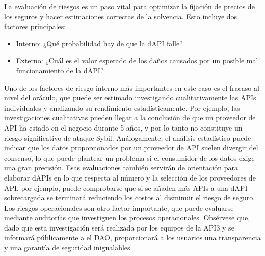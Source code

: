 \documentclass[11pt]{article}
\begin{document}
La evaluación de riesgos es un paso vital para optimizar la fijación de precios de los seguros y hacer estimaciones correctas de la solvencia. Esto incluye dos factores principales:

\begin{itemize}
    \item Interno: ¿Qué probabilidad hay de que la dAPI falle?
    \item Externo: ¿Cuál es el valor esperado de los daños causados por un posible mal funcionamiento de la dAPI?
\end{itemize}

Uno de los factores de riesgo interno más importantes en este caso es el fracaso al nivel del oráculo, que puede ser estimado investigando cualitativamente las APIs individuales y analizando su rendimiento estadísticamente. Por ejemplo, las investigaciones cualitativas pueden llegar a la conclusión de que un proveedor de API ha estado en el negocio durante 5 años, y por lo tanto no constituye un riesgo significativo de ataque Sybil. Análogamente, el análisis estadístico puede indicar que los datos proporcionados por un proveedor de API suelen divergir del consenso, lo que puede plantear un problema si el consumidor de los datos exige una gran precisión. Esas evaluaciones también servirán de orientación para elaborar dAPIs en lo que respecta al número y la selección de los proveedores de API, por ejemplo, puede comprobarse que si se añaden más APIs a una dAPI sobrecargada se terminará reduciendo los costos al disminuir el riesgo de seguro. Los riesgos operacionales son otro factor importante, que puede evaluarse mediante auditorías que investiguen los procesos operacionales. Obsérvese que, dado que esta investigación será realizada por los equipos de la API3 y se informará públicamente a el DAO, proporcionará a los usuarios una transparencia y una garantía de seguridad inigualables.
\end{document}

